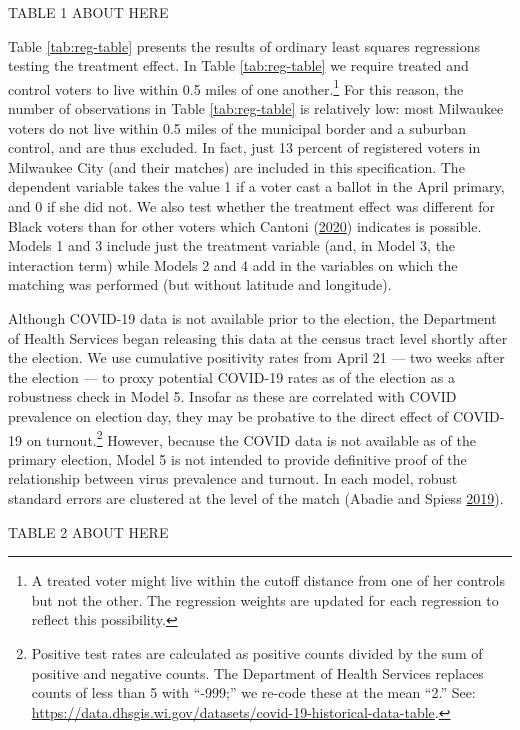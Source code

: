 \documentclass[
  12pt,
]{article}
\begin{document}
TABLE 1 ABOUT HERE

Table \ref{tab:reg-table} presents the results of ordinary least squares regressions testing the treatment effect. In Table \ref{tab:reg-table} we require treated and control voters to live within 0.5 miles of one another.\footnote{A treated voter might live within the cutoff distance from one of her controls but not the other. The regression weights are updated for each regression to reflect this possibility.} For this reason, the number of observations in Table \ref{tab:reg-table} is relatively low: most Milwaukee voters do not live within 0.5 miles of the municipal border and a suburban control, and are thus excluded. In fact, just 13 percent of registered voters in Milwaukee City (and their matches) are included in this specification. The dependent variable takes the value 1 if a voter cast a ballot in the April primary, and 0 if she did not. We also test whether the treatment effect was different for Black voters than for other voters which Cantoni (\protect\hyperlink{ref-Cantoni2020}{2020}) indicates is possible. Models 1 and 3 include just the treatment variable (and, in Model 3, the interaction term) while Models 2 and 4 add in the variables on which the matching was performed (but without latitude and longitude).

Although COVID-19 data is not available prior to the election, the Department of Health Services began releasing this data at the census tract level shortly after the election. We use cumulative positivity rates from April 21 --- two weeks after the election --- to proxy potential COVID-19 rates as of the election as a robustness check in Model 5. Insofar as these are correlated with COVID prevalence on election day, they may be probative to the direct effect of COVID-19 on turnout.\footnote{Positive test rates are calculated as positive counts divided by the sum of positive and negative counts. The Department of Health Services replaces counts of less than 5 with ``-999;'' we re-code these at the mean ``2.'' See: \url{https://data.dhsgis.wi.gov/datasets/covid-19-historical-data-table}.} However, because the COVID data is not available as of the primary election, Model 5 is not intended to provide definitive proof of the relationship between virus prevalence and turnout. In each model, robust standard errors are clustered at the level of the match (Abadie and Spiess \protect\hyperlink{ref-Abadie2019}{2019}).

TABLE 2 ABOUT HERE
\end{document}
